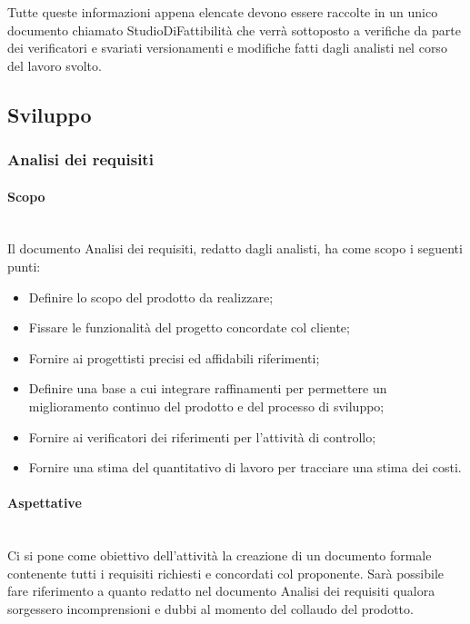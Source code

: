 Tutte queste informazioni appena elencate devono essere raccolte in un unico documento chiamato StudioDiFattibilità che verrà sottoposto a verifiche da parte dei verificatori e svariati versionamenti e modifiche fatti dagli analisti nel corso del lavoro svolto.

\subsection{Sviluppo}
\subsubsection{Analisi dei requisiti}
\paragraph{Scopo}\mbox{}\\

Il documento Analisi dei requisiti, redatto dagli analisti, ha come scopo i seguenti punti:

\begin{itemize}
\item Definire lo scopo del prodotto da realizzare;
\item Fissare le funzionalità del progetto concordate col cliente;
\item Fornire ai progettisti precisi ed affidabili riferimenti;
\item Definire una base a cui integrare raffinamenti per permettere un miglioramento continuo del prodotto e del processo di sviluppo;
\item Fornire ai verificatori dei riferimenti per l’attività di controllo;
\item Fornire una stima del quantitativo di lavoro per tracciare una stima dei costi. 
\end{itemize}

\paragraph{Aspettative}\mbox{}\\
Ci si pone come obiettivo dell’attività la creazione di un documento formale contenente tutti i requisiti richiesti e concordati col proponente. Sarà possibile fare riferimento a quanto redatto nel documento Analisi dei requisiti qualora sorgessero incomprensioni e dubbi al momento del collaudo del prodotto.

